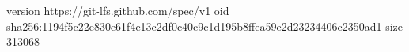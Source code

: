 version https://git-lfs.github.com/spec/v1
oid sha256:1194f5c22e830e61f4e13c2df0c40c9c1d195b8ffea59e2d23234406c2350ad1
size 313068
